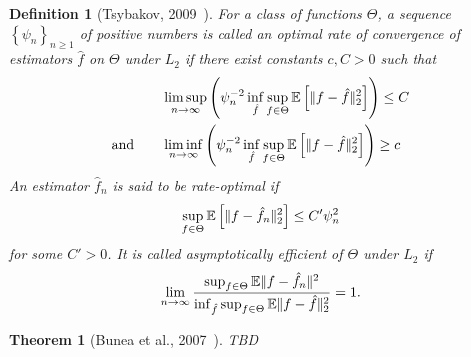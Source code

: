 \documentclass[12pt, letter paper]{article}
\newcommand{\1}{\mathmybb{1}}
\newtheorem{definition}{Definition}[section]
\newtheorem{theorem}[proposition]{Theorem}
\newcommand{\0}{\emptyset}
\newcommand{\E}{\mathbb{E}}
\newcommand{\Ep}[1]{\mathbb{E}\left[ #1 \right]}
\newcommand{\paren}[1]{\left(#1 \right)}
\newcommand{\set}[1]{\left\{ #1 \right\}}
\newcommand{\norm}[1]{|\hspace{-1pt}|#1 |\hspace{-1pt}|}
\newcommand{\normsq}[1]{\norm{#1}^{2}}
\begin{document}
\begin{definition}[Tsybakov, 2009~\cite{tsybakov_introduction_2009}]
    For a class of functions \(\Theta\), a sequence \(\set{\psi_{n}}_{n\geq1}\) of positive numbers is called an \emph{optimal rate of convergence} of estimators \(\hat{f}\) on \(\Theta\) under \(L_{2}\) if there exist constants \(c, C>0\) such that
    \begin{align}
        &\limsup_{n\to\infty}\paren{\psi_{n}^{-2}\inf_{\hat{f}}\sup_{f\in\Theta}\Ep{\norm{f - \hat{f}}_{2}^{2}}}\leq C\\
        \text{and}\qquad&\liminf_{n\to\infty}\paren{\psi_{n}^{-2}\inf_{\hat{f}}\sup_{f\in\Theta}\Ep{\norm{f - \hat{f}}_{2}^{2}}}\geq c
    \end{align}
    An estimator \(\hat{f}_{n}\) is said to be \emph{rate-optimal} if 
    \[\sup_{f\in\Theta}\Ep{\norm{f - \hat{f}_{n}}_{2}^{2}} \leq C'\psi_{n}^{2}\]
    for some \(C'>0\). It is called \emph{asymptotically efficient} of \(\Theta\) under \(L_{2}\) if 
    \[\lim_{n\to\infty}\frac{\sup_{f\in\Theta}\E{\normsq{f-\hat{f}_{n}}}}{\inf_{\hat{f}}\sup_{f\in\Theta}\E{\norm{f - \hat{f}}_{2}^{2}}}=1.\]
\end{definition}

\begin{theorem}[Bunea et al., 2007~\cite{bunea_2007}]\label{prop:buneath5.1}
    TBD
\end{theorem}

\newpage
\printbibliography{}
\end{document}
